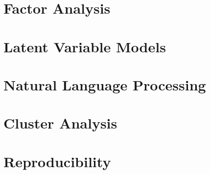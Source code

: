 \documentclass[]{book}
\theoremstyle{definition}
\theoremstyle{definition}
\theoremstyle{remark}
\begin{document}
\chapter{Factor Analysis}\label{factor-analysis}

\chapter{Latent Variable Models}\label{latent-variable-models}

\chapter{Natural Language Processing}\label{natural-language-processing}

\chapter{Cluster Analysis}\label{cluster-analysis}

\chapter{Reproducibility}\label{reproducibility}


\end{document}
